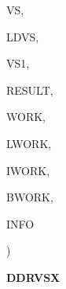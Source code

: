 {\begin{DoxyParamCaption}
\item[{double {\bf precision}, dimension( ldvs, $\ast$ )}]{V\+S, }
\item[{integer}]{L\+D\+V\+S, }
\item[{double {\bf precision}, dimension( ldvs, $\ast$ )}]{V\+S1, }
\item[{double {\bf precision}, dimension( 17 )}]{R\+E\+S\+U\+L\+T, }
\item[{double {\bf precision}, dimension( $\ast$ )}]{W\+O\+R\+K, }
\item[{integer}]{L\+W\+O\+R\+K, }
\item[{integer, dimension( $\ast$ )}]{I\+W\+O\+R\+K, }
\item[{{\bf logical}, dimension( $\ast$ )}]{B\+W\+O\+R\+K, }
\item[{integer}]{I\+N\+F\+O}
\end{DoxyParamCaption}
)}\label{group__double__eig_ga35b419f2aaa6ac71abbaa387a29e5ee6}


{\bfseries D\+D\+R\+V\+S\+X} 

